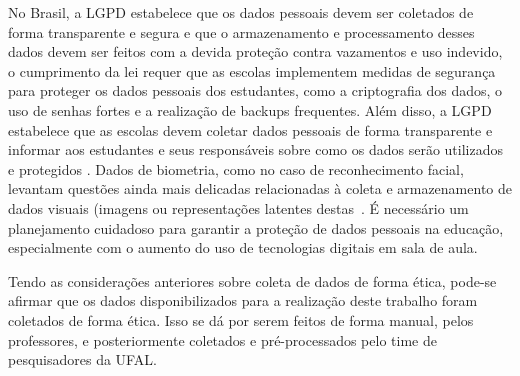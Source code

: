 {No Brasil,} a LGPD estabelece que os dados pessoais devem ser coletados de forma transparente e segura e que o armazenamento e processamento desses dados devem ser feitos com a devida proteção contra vazamentos e uso indevido, o cumprimento da lei requer que as escolas implementem medidas de segurança para proteger os dados pessoais dos estudantes, como a criptografia dos dados, o uso de senhas fortes e a realização de backups frequentes. Além disso, a LGPD estabelece que as escolas devem coletar dados pessoais de forma transparente e informar aos estudantes e seus responsáveis sobre como os dados serão utilizados e protegidos \cite{Ferreira2022}. Dados de biometria, como no caso de reconhecimento facial, levantam questões ainda mais delicadas relacionadas à coleta e armazenamento de dados visuais (imagens ou representações latentes destas~\cite{wang2021deep}.  É necessário um planejamento cuidadoso para garantir a proteção de dados pessoais na educação, especialmente com o aumento do uso de tecnologias digitais em sala de aula.


Tendo as considerações anteriores sobre coleta de dados de forma ética, pode-se afirmar que os dados disponibilizados para a realização deste trabalho foram coletados de forma ética. Isso se dá por serem feitos de forma manual, pelos professores, e posteriormente coletados e pré-processados pelo time de pesquisadores da UFAL.